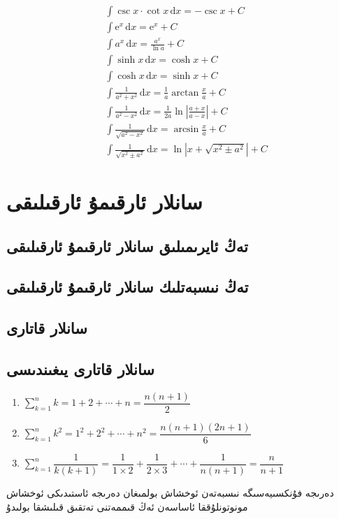 \begin{align*}
     & \int\csc x \cdot\cot x \,\mathrm{d}x=-\csc x+C                                                                         \\[7pt]
     & \int \mathrm{e}^x \,\mathrm{d}x=\mathrm{e}^x+C                                                                         \\[7pt]
     & \int a^x\,\mathrm{d}x=\frac{a^x}{\ln a}+C                                                                              \\[7pt]
     & \int \sinh x\,\mathrm{d}x=\cosh x+C                                                                                    \\[7pt]
     & \int \cosh x\,\mathrm{d}x=\sinh x+C                                                                                    \\[7pt]
     & \int \frac{1}{a^2+x^2}\,\mathrm{d}x=\frac{1}{a}\arctan\frac{x}{a}+C                                                    \\[7pt]
     & \int \frac{1}{a^2-x^2}\,\mathrm{d}x=\frac{1}{2a}\ln \left|\frac{a+x}{a-x}\right|+C                                     \\[7pt]
     & \int \frac{1}{\sqrt{a^2-x^2}}\,\mathrm{d}x=\arcsin\frac{x}{a}+C                                                        \\[7pt]
     & \int \frac{1}{\sqrt{x^2\pm a^2}}\,\mathrm{d}x=\ln \left|x+\sqrt{x^2\pm a^2}\right|+C
\end{align*}

\section{سانلار ئارقىمۇ ئارقىلىقى}
\subsection{تەڭ ئايرىمىلىق سانلار ئارقىمۇ ئارقىلىقى}

\subsection{تەڭ نىسبەتلىك سانلار ئارقىمۇ ئارقىلىقى}

\subsection{سانلار قاتارى}

\subsection{سانلار قاتارى يىغىندىسى}
\begin{english}
\begin{enumerate}
    \item $\sum_{k=1}^nk=1+2+\cdots+n=\dfrac{n(n+1)}{2}$
    \item $\sum_{k=1}^nk^2=1^2+2^2+\cdots+n^2=\dfrac{n(n+1)(2n+1)}{6}$
    \item $\sum_{k=1}^n\dfrac{1}{k(k+1)}=\dfrac{1}{1\times 2}+\dfrac{1}{2\times 3}+\cdots+\dfrac{1}{n(n+1)}=\dfrac{n}{n+1}$
\end{enumerate}
\end{english}

دەرىجە فۇنكسىيەسىگە نىسبەتەن ئوخشاش بولمىغان دەرىجە ئاستىدىكى ئوخشاش مونوتونلۇققا ئاساسەن ئەڭ قىممەتنى تەتقىق قىلىشقا بولىدۇ





